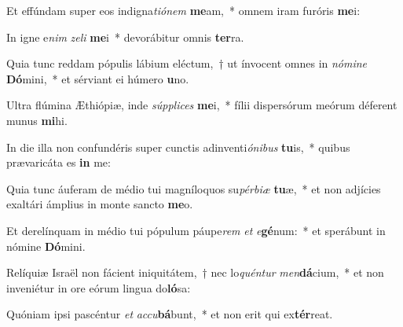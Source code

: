\item Et effúndam super eos indigna\textit{ti}\textit{ó}\textit{nem} \textbf{me}am,~* omnem iram furóris \textbf{me}i:
\item In igne e\textit{nim} \textit{ze}\textit{li} \textbf{me}i~* devorábitur omnis \textbf{ter}ra.
\item Quia tunc reddam pópulis lábium eléctum,~† ut ínvocent omnes in \textit{nó}\textit{mi}\textit{ne} \textbf{Dó}mini,~* et sérviant ei húmero \textbf{u}no.
\item Ultra flúmina Æthiópiæ, inde \textit{súp}\textit{pli}\textit{ces} \textbf{me}i,~* fílii dispersórum meórum déferent munus \textbf{mi}hi.
\item In die illa non confundéris super cunctis adinventi\textit{ó}\textit{ni}\textit{bus} \textbf{tu}is,~* quibus prævaricáta es \textbf{in} me:
\item Quia tunc áuferam de médio tui magníloquos su\textit{pér}\textit{bi}\textit{æ} \textbf{tu}æ,~* et non adjícies exaltári ámplius in monte sancto \textbf{me}o.
\item Et derelínquam in médio tui pópulum páupe\textit{rem} \textit{et} \textit{e}\textbf{gé}num:~* et sperábunt in nómine \textbf{Dó}mini.
\item Relíquiæ Israël non fácient iniquitátem,~† nec lo\textit{quén}\textit{tur} \textit{men}\textbf{dá}cium,~* et non inveniétur in ore eórum lingua do\textbf{ló}sa:
\item Quóniam ipsi pascéntur \textit{et} \textit{ac}\textit{cu}\textbf{bá}bunt,~* et non erit qui ex\textbf{tér}reat.
